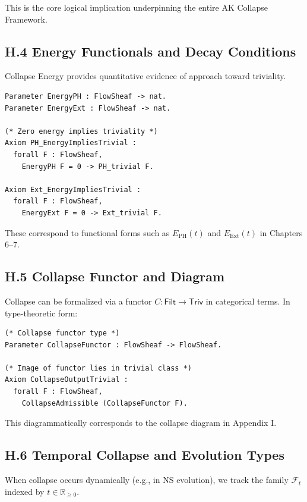 \documentclass[11pt]{article}
\begin{document}
This is the core logical implication underpinning the entire AK Collapse Framework.

\subsection{H.4 Energy Functionals and Decay Conditions}

Collapse Energy provides quantitative evidence of approach toward triviality.

\begin{lstlisting}[language=Coq, caption=Collapse Energy Functionals]
Parameter EnergyPH : FlowSheaf -> nat.
Parameter EnergyExt : FlowSheaf -> nat.

(* Zero energy implies triviality *)
Axiom PH_EnergyImpliesTrivial :
  forall F : FlowSheaf,
    EnergyPH F = 0 -> PH_trivial F.

Axiom Ext_EnergyImpliesTrivial :
  forall F : FlowSheaf,
    EnergyExt F = 0 -> Ext_trivial F.
\end{lstlisting}

These correspond to functional forms such as $E_{\mathrm{PH}}(t)$ and $E_{\mathrm{Ext}}(t)$ in Chapters 6–7.

\subsection{H.5 Collapse Functor and Diagram}

Collapse can be formalized via a functor $C : \mathsf{Filt} \to \mathsf{Triv}$ in categorical terms. In type-theoretic form:

\begin{lstlisting}[language=Coq, caption=Collapse Functor and Output Class]
(* Collapse functor type *)
Parameter CollapseFunctor : FlowSheaf -> FlowSheaf.

(* Image of functor lies in trivial class *)
Axiom CollapseOutputTrivial :
  forall F : FlowSheaf,
    CollapseAdmissible (CollapseFunctor F).
\end{lstlisting}

This diagrammatically corresponds to the collapse diagram in Appendix I.

\subsection{H.6 Temporal Collapse and Evolution Types}

When collapse occurs dynamically (e.g., in NS evolution), we track the family $\mathcal{F}_t$ indexed by $t \in \mathbb{R}_{\geq 0}$.
\end{document}
